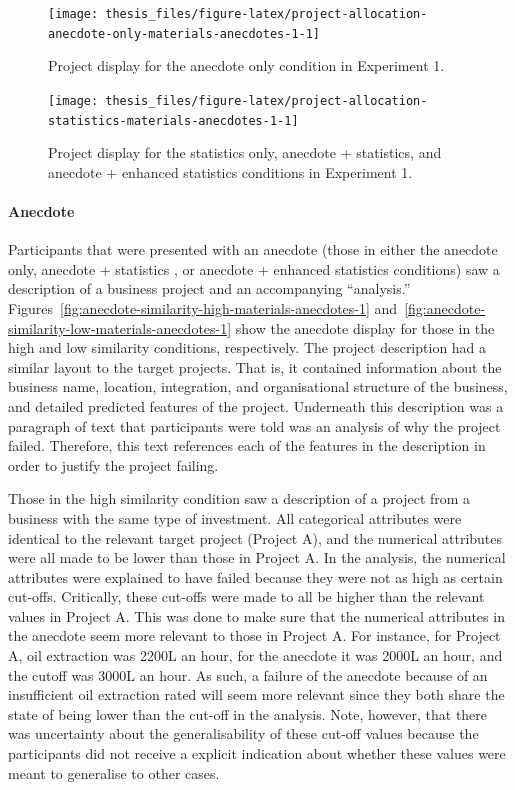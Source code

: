 \documentclass[a4paper, nobind, dvipsnames]{templates/ociamthesis}
\theoremstyle{definition}
\theoremstyle{definition}
\theoremstyle{definition}
\theoremstyle{definition}
\theoremstyle{remark}
\begin{document}
\begin{figure}
\texttt{[image: thesis\_files/figure-latex/project-allocation-anecdote-only-materials-anecdotes-1-1]} \caption{Project display for the anecdote only condition in Experiment 1.}\label{fig:project-allocation-anecdote-only-materials-anecdotes-1}
\end{figure}



\begin{figure}
\texttt{[image: thesis\_files/figure-latex/project-allocation-statistics-materials-anecdotes-1-1]} \caption{Project display for the statistics only, anecdote + statistics, and anecdote + enhanced statistics conditions in Experiment 1.}\label{fig:project-allocation-statistics-materials-anecdotes-1}
\end{figure}

\paragraph{Anecdote}

Participants that were presented with an anecdote (those in either the anecdote
only, anecdote + statistics , or anecdote + enhanced statistics conditions) saw
a description of a business project and an accompanying ``analysis.''
Figures~\ref{fig:anecdote-similarity-high-materials-anecdotes-1}
and~\ref{fig:anecdote-similarity-low-materials-anecdotes-1} show the anecdote
display for those in the high and low similarity conditions, respectively. The
project description had a similar layout to the target projects. That is, it
contained information about the business name, location, integration, and
organisational structure of the business, and detailed predicted features of the
project. Underneath this description was a paragraph of text that participants
were told was an analysis of why the project failed. Therefore, this text
references each of the features in the description in order to justify the
project failing.

Those in the high similarity condition saw a description of a project from a
business with the same type of investment. All categorical attributes were
identical to the relevant target project (Project A), and the numerical
attributes were all made to be lower than those in Project A. In the analysis,
the numerical attributes were explained to have failed because they were not as
high as certain cut-offs. Critically, these cut-offs were made to all be higher
than the relevant values in Project A. This was done to make sure that the
numerical attributes in the anecdote seem more relevant to those in Project A.
For instance, for Project A, oil extraction was 2200L an hour, for the anecdote
it was 2000L an hour, and the cutoff was 3000L an hour. As such, a failure of
the anecdote because of an insufficient oil extraction rated will seem more
relevant since they both share the state of being lower than the cut-off in the
analysis. Note, however, that there was uncertainty about the generalisability
of these cut-off values because the participants did not receive a explicit
indication about whether these values were meant to generalise to other cases.
\end{document}
